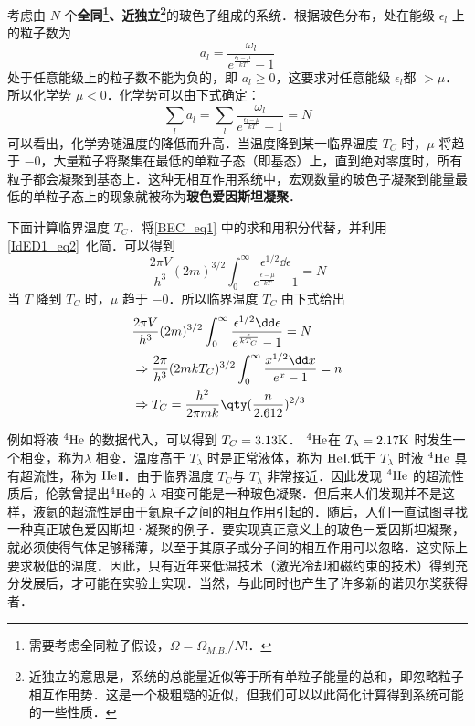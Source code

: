 

考虑由 $N$ 个\textbf{全同\footnote{需要考虑全同粒子假设，$\Omega=\Omega_{M.B.}/N!$．}、近独立\footnote{近独立的意思是，系统的总能量近似等于所有单粒子能量的总和，即忽略粒子相互作用势．这是一个极粗糙的近似，但我们可以以此简化计算得到系统可能的一些性质．}}的玻色子组成的系统．根据玻色分布，处在能级 $\epsilon_l$ 上的粒子数为
\begin{equation}
a_l=\frac{\omega_l}{e^{\frac{\epsilon_l-\mu}{kT}}-1}
\end{equation}
处于任意能级上的粒子数不能为负的，即 $a_l\ge 0$，这要求对任意能级 $\epsilon_l$都 $>\mu$．所以化学势 $\mu<0$．化学势可以由下式确定：
\begin{equation}\label{BEC_eq1}
\sum_la_l=\sum_l \frac{\omega_l}{e^{\frac{\epsilon_l-\mu}{kT}}-1} =N
\end{equation}
可以看出，化学势随温度的降低而升高．当温度降到某一临界温度 $T_C$ 时，$\mu$ 将趋于 $-0$，大量粒子将聚集在最低的单粒子态（即基态）上，直到绝对零度时，所有粒子都会凝聚到基态上．这种无相互作用系统中，宏观数量的玻色子凝聚到能量最低的单粒子态上的现象就被称为\textbf{玻色爱因斯坦凝聚}．

下面计算临界温度 $T_C$．将\autoref{BEC_eq1} 中的求和用积分代替，并利用\autoref{IdED1_eq2}~化简．可以得到
\begin{equation}
\frac{2\pi V}{h^3}(2m)^{3/2}\int_0^\infty \frac{\epsilon^{1/2}\dd \epsilon}{e^{\frac{\epsilon-\mu}{kT}}-1}=N
\end{equation}
当 $T$ 降到 $T_C$ 时，$\mu$ 趋于 $-0$．所以临界温度 $T_C$ 由下式给出
\begin{equation}\label{BEC_eq2}
\begin{aligned}
&\frac{2\pi V}{h^3}(2m)^{3/2}\int_0^\infty \frac{\epsilon^{1/2}\dd \epsilon}{e^{\frac{\epsilon}{kT_C}}-1}=N\\
&\Rightarrow \frac{2\pi}{h^3}(2mkT_C)^{3/2}\int_0^\infty \frac{x^{1/2}\dd x}{e^x-1}=n\\
&\Rightarrow T_C=\frac{h^2}{2\pi mk}\qty(\frac{n}{2.612})^{2/3}
\end{aligned}
\end{equation}

例如将液 $^4\rm{He}$ 的数据代入，可以得到 $T_C=3.13\rm{K}$．  $^4\rm{He}$在 $T_\lambda=2.17\rm{K}$ 时发生一个相变，称为$\lambda$ 相变．温度高于 $T_\lambda$ 时是正常液体，称为 $\rm{He}$Ⅰ.低于 $T_\lambda$ 时液 $^4\rm{He}$ 具有超流性，称为 $\rm{He}$Ⅱ．由于临界温度 $T_C$与 $T_\lambda$ 非常接近．因此发现 $^4\rm{He}$ 的超流性质后，伦敦曾提出$^4\rm{He}$的 $\lambda$ 相变可能是一种玻色凝聚．但后来人们发现并不是这样，液氦的超流性是由于氦原子之间的相互作用引起的．随后，人们一直试图寻找一种真正玻色爱因斯坦·凝聚的例子．要实现真正意义上的玻色－爱因斯坦凝聚，就必须使得气体足够稀薄，以至于其原子或分子间的相互作用可以忽略．这实际上要求极低的温度．因此，只有近年来低温技术（激光冷却和磁约束的技术）得到充分发展后，才可能在实验上实现．当然，与此同时也产生了许多新的诺贝尔奖获得者．

